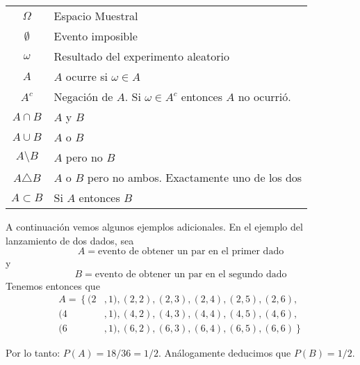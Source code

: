 \documentclass[14pt]{extreport}
\newcounter{ejemplo}[chapter]
\begin{document}
\begin{table}
  \centering
  \begin{tabular}{|c|l|}
    \hline
    $\Omega$       & Espacio Muestral                                              \\
    $\emptyset$    & Evento imposible                                              \\
    $\omega$       & Resultado del experimento aleatorio                           \\
    $A$            & $A$ ocurre si $\omega \in A$                                  \\
    $A^c$          & Negación de $A$. Si $\omega \in A^c$ entonces $A$ no ocurrió. \\
    $A\cap B$      & $A$ y $B$                                                     \\
    $A\cup B$      & $A$ o $B$                                                     \\
    $A\setminus B$ & $A$ pero no $B$                                               \\
    $A\triangle B$ & $A$ o $B$ pero no ambos. Exactamente uno de los dos           \\
    $A\subset B$   & Si $A$ entonces $B$                                           \\
    \hline
  \end{tabular}
\end{table}
A continuación vemos algunos ejemplos adicionales. En el ejemplo del lanzamiento de dos dados, sea
$$
  A = \text{evento de obtener un par en el primer dado}
$$
y
$$
  B = \text{evento de obtener un par en el segundo dado}
$$
Tenemos entonces que
\begin{equation*}
  \begin{split}
    A = \left\{\right.(2&, 1), (2, 2), (2, 3), (2, 4), (2, 5), (2,6),  \\
    (4&, 1), (4, 2), (4, 3), (4, 4), (4, 5), (4, 6), \\
    (6&, 1), (6, 2), (6, 3), (6, 4), (6, 5), (6, 6)   \left.\right\}
  \end{split}
\end{equation*}

Por lo tanto: $P(A) = 18/36 = 1/2$. Análogamente deducimos que $P(B) = 1/2$.
\end{document}
